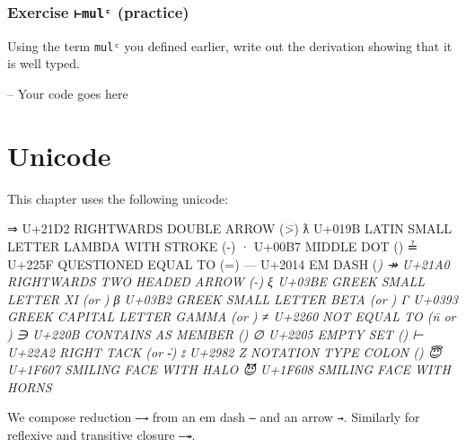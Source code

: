 \hypertarget{exercise-mulux1d9c-practice-1}{%
\subsubsection{\texorpdfstring{Exercise \texttt{⊢mulᶜ}
(practice)}{Exercise ⊢mulᶜ (practice)}}\label{exercise-mulux1d9c-practice-1}}

Using the term \texttt{mulᶜ} you defined earlier, write out the
derivation showing that it is well typed.

\begin{fence}
\begin{code}
-- Your code goes here
\end{code}
\end{fence}

\hypertarget{unicode}{%
\section{Unicode}\label{unicode}}

This chapter uses the following unicode:

\begin{myDisplay}
⇒  U+21D2  RIGHTWARDS DOUBLE ARROW (\=>)
ƛ  U+019B  LATIN SMALL LETTER LAMBDA WITH STROKE (\Gl-)
·  U+00B7  MIDDLE DOT (\cdot)
≟  U+225F  QUESTIONED EQUAL TO (\?=)
—  U+2014  EM DASH (\em)
↠  U+21A0  RIGHTWARDS TWO HEADED ARROW (\rr-)
ξ  U+03BE  GREEK SMALL LETTER XI (\Gx or \xi)
β  U+03B2  GREEK SMALL LETTER BETA (\Gb or \beta)
Γ  U+0393  GREEK CAPITAL LETTER GAMMA (\GG or \Gamma)
≠  U+2260  NOT EQUAL TO (\=n or \ne)
∋  U+220B  CONTAINS AS MEMBER (\ni)
∅  U+2205  EMPTY SET (\0)
⊢  U+22A2  RIGHT TACK (\vdash or \|-)
⦂  U+2982  Z NOTATION TYPE COLON (\:)
😇  U+1F607  SMILING FACE WITH HALO
😈  U+1F608  SMILING FACE WITH HORNS
\end{myDisplay}

We compose reduction \texttt{—→} from an em dash \texttt{—} and an arrow
\texttt{→}. Similarly for reflexive and transitive closure \texttt{—↠}.

